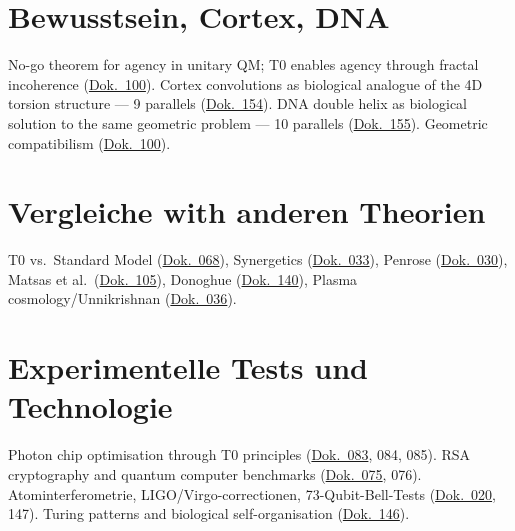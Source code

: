 \section{Bewusstsein, Cortex, DNA}
No-go theorem for agency in unitary QM; T0 enables agency through fractal incoherence (\href{https://github.com/jpascher/T0-Time-Mass-Duality/blob/main/2/pdf/100_Consciousness_De.pdf}{Dok.~100}). Cortex convolutions as biological analogue of the 4D torsion structure --- 9 parallels (\href{https://github.com/jpascher/T0-Time-Mass-Duality/blob/main/2/pdf/154_Cortex_De.pdf}{Dok.~154}). DNA double helix as biological solution to the same geometric problem --- 10 parallels (\href{https://github.com/jpascher/T0-Time-Mass-Duality/blob/main/2/pdf/155_DNA_De.pdf}{Dok.~155}). Geometric compatibilism (\href{https://github.com/jpascher/T0-Time-Mass-Duality/blob/main/2/pdf/100_Consciousness_De.pdf}{Dok.~100}).

\section{Vergleiche with anderen Theorien}
T0 vs.\ Standard Model (\href{https://github.com/jpascher/T0-Time-Mass-Duality/blob/main/2/pdf/068_T0vsESM_ConceptualAnalysis_De.pdf}{Dok.~068}), Synergetics (\href{https://github.com/jpascher/T0-Time-Mass-Duality/blob/main/2/pdf/033_T0-Theory-vs-Synergetics_De.pdf}{Dok.~033}), Penrose (\href{https://github.com/jpascher/T0-Time-Mass-Duality/blob/main/2/pdf/030_T0_penrose_De.pdf}{Dok.~030}), Matsas et al.\ (\href{https://github.com/jpascher/T0-Time-Mass-Duality/blob/main/2/pdf/105_Matsas_T0_Vergleich_De.pdf}{Dok.~105}), Donoghue (\href{https://github.com/jpascher/T0-Time-Mass-Duality/blob/main/2/pdf/140_T0_CMB_Donoghue_Analyse_De.pdf}{Dok.~140}), Plasma cosmology/Unnikrishnan (\href{https://github.com/jpascher/T0-Time-Mass-Duality/blob/main/2/pdf/036_T0_peratt_De.pdf}{Dok.~036}).

\section{Experimentelle Tests und Technologie}
Photon chip optimisation through T0 principles (\href{https://github.com/jpascher/T0-Time-Mass-Duality/blob/main/2/pdf/083_T0_photonenchip-china_De.pdf}{Dok.~083}, 084, 085). RSA cryptography and quantum computer benchmarks (\href{https://github.com/jpascher/T0-Time-Mass-Duality/blob/main/2/pdf/075_RSA_De.pdf}{Dok.~075}, 076). Atominterferometrie, LIGO/Virgo-correctionen, 73-Qubit-Bell-Tests (\href{https://github.com/jpascher/T0-Time-Mass-Duality/blob/main/2/pdf/020_T0_QM-QFT-RT_De.pdf}{Dok.~020}, 147). Turing patterns and biological self-organisation (\href{https://github.com/jpascher/T0-Time-Mass-Duality/blob/main/2/pdf/146_turing_De.pdf}{Dok.~146}).

